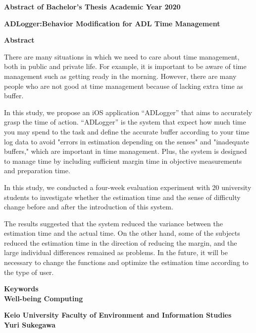 \begin{center}
\textbf{\large Abstract of Bachelor's Thesis Academic Year 2020}

\vspace{6mm}

\textbf{\large ADLogger:Behavior Modification for ADL Time Management}
\end{center}

\vspace{10mm}


\begin{flushleft}
\textbf{Abstract}\\
\end{flushleft}

There are many situations in which we need to care about time management, both in public and private life.
For example, it is important to be aware of time management such as getting ready in the morning.
However, there are many people who are not good at time management because of lacking extra time as buffer.

In this study, we propose an iOS application  “ADLogger” that aims to accurately grasp the time of action.
“ADLogger” is the system that expect how much time you may spend to the task and define the accurate buffer according to your time log data to avoid "errors in estimation depending on the senses" and "inadequate buffers," which are important in time management.
Plus, the system is designed to manage time by including sufficient margin time in objective measurements and preparation time.

In this study, we conducted a four-week evaluation experiment with 20 university students to investigate whether the estimation time and the sense of difficulty change before and after the introduction of this system.

The results suggested that the system reduced the variance between the estimation time and the actual time.
On the other hand, some of the subjects reduced the estimation time in the direction of reducing the margin, and the large individual differences remained as problems.
In the future, it will be necessary to change the functions and optimize the estimation time according to the type of user.

\begin{flushleft}
\textbf{Keywords}\\
\textbf{Well-being Computing}
\end{flushleft}

\begin{flushright}
\textbf{Keio University Faculty of Environment and Information Studies}\\
\textbf{Yuri Sukegawa}\\
\end{flushright}